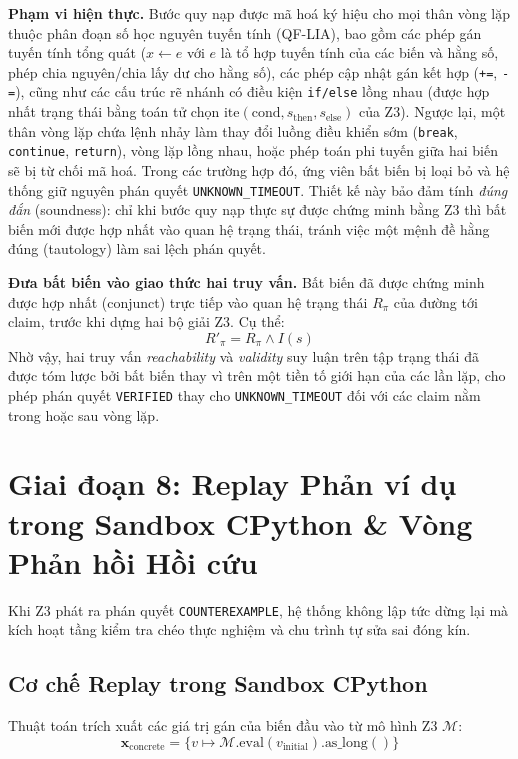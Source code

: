 \textbf{Phạm vi hiện thực.}
Bước quy nạp được mã hoá ký hiệu cho mọi thân vòng lặp thuộc phân đoạn số học nguyên tuyến tính (QF-LIA), bao gồm các phép gán tuyến tính tổng quát ($x \leftarrow e$ với $e$ là tổ hợp tuyến tính của các biến và hằng số, phép chia nguyên/chia lấy dư cho hằng số), các phép cập nhật gán kết hợp (\texttt{+=}, \texttt{-=}), cũng như các cấu trúc rẽ nhánh có điều kiện \texttt{if/else} lồng nhau (được hợp nhất trạng thái bằng toán tử chọn $\text{ite}(\text{cond}, s_{\text{then}}, s_{\text{else}})$ của Z3). Ngược lại, một thân vòng lặp chứa lệnh nhảy làm thay đổi luồng điều khiển sớm (\texttt{break}, \texttt{continue}, \texttt{return}), vòng lặp lồng nhau, hoặc phép toán phi tuyến giữa hai biến sẽ bị từ chối mã hoá. Trong các trường hợp đó, ứng viên bất biến bị loại bỏ và hệ thống giữ nguyên phán quyết \texttt{UNKNOWN\_TIMEOUT}. Thiết kế này bảo đảm tính \emph{đúng đắn} (soundness): chỉ khi bước quy nạp thực sự được chứng minh bằng Z3 thì bất biến mới được hợp nhất vào quan hệ trạng thái, tránh việc một mệnh đề hằng đúng (tautology) làm sai lệch phán quyết.

\textbf{Đưa bất biến vào giao thức hai truy vấn.}
Bất biến đã được chứng minh được hợp nhất (conjunct) trực tiếp vào quan hệ trạng thái $R_\pi$ của đường tới claim, trước khi dựng hai bộ giải Z3. Cụ thể:
\begin{equation}
R'_\pi = R_\pi \land I(s)
\end{equation}
Nhờ vậy, hai truy vấn \emph{reachability} và \emph{validity} suy luận trên tập trạng thái đã được tóm lược bởi bất biến thay vì trên một tiền tố giới hạn của các lần lặp, cho phép phán quyết \texttt{VERIFIED} thay cho \texttt{UNKNOWN\_TIMEOUT} đối với các claim nằm trong hoặc sau vòng lặp.

\section{Giai đoạn 8: Replay Phản ví dụ trong Sandbox CPython \& Vòng Phản hồi Hồi cứu}
\label{sec:replay_and_retrospective_feedback}

Khi Z3 phát ra phán quyết \texttt{COUNTEREXAMPLE}, hệ thống không lập tức dừng lại mà kích hoạt tầng kiểm tra chéo thực nghiệm và chu trình tự sửa sai đóng kín.

\subsection{Cơ chế Replay trong Sandbox CPython}
Thuật toán trích xuất các giá trị gán của biến đầu vào từ mô hình Z3 $\mathcal{M}$:
\begin{equation}
\mathbf{x}_{\text{concrete}} = \{ v \mapsto \mathcal{M}.\text{eval}(v_{\text{initial}}).\text{as\_long}() \}
\end{equation}

